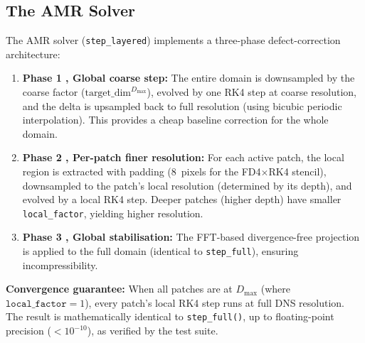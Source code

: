 \documentclass[12pt, a4paper, oneside]{report}
\begin{document}
\subsection{The AMR Solver}

The AMR solver (\texttt{step\_layered}) implements a three-phase defect-correction architecture:
\begin{enumerate}
    \item \textbf{Phase 1 ,  Global coarse step:} The entire domain is downsampled by the coarse factor ($\text{target\_dim}^{D_{\max}}$), evolved by one RK4 step at coarse resolution, and the delta is upsampled back to full resolution (using bicubic periodic interpolation). This provides a cheap baseline correction for the whole domain.
    \item \textbf{Phase 2 ,  Per-patch finer resolution:} For each active patch, the local region is extracted with padding (8~pixels for the FD4$\times$RK4 stencil), downsampled to the patch's local resolution (determined by its depth), and evolved by a local RK4 step. Deeper patches (higher depth) have smaller \texttt{local\_factor}, yielding higher resolution.
    \item \textbf{Phase 3 ,  Global stabilisation:} The FFT-based divergence-free projection is applied to the full domain (identical to \texttt{step\_full}), ensuring incompressibility.
\end{enumerate}
\textbf{Convergence guarantee:} When all patches are at $D_{\max}$ (where $\texttt{local\_factor} = 1$), every patch's local RK4 step runs at full DNS resolution. The result is mathematically identical to \texttt{step\_full()}, up to floating-point precision ($< 10^{-10}$), as verified by the test suite.
\end{document}
